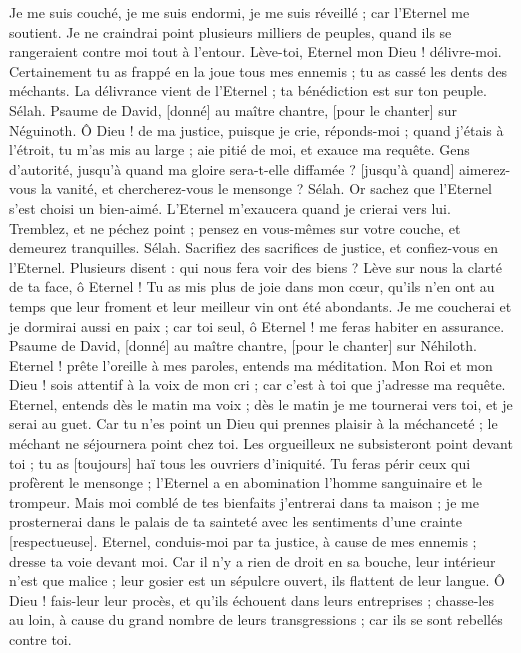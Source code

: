 \begin{multicols}{2}
Je me suis couché, je me suis endormi, je me suis réveillé ; car l'Eternel me soutient.
Je ne craindrai point plusieurs milliers de peuples, quand ils se rangeraient contre moi tout à l'entour.
Lève-toi, Eternel mon Dieu ! délivre-moi. Certainement tu as frappé en la joue tous mes ennemis ; tu as cassé les dents des méchants.
La délivrance vient de l'Eternel ; ta bénédiction est sur ton peuple. Sélah.
\VerseOne{}Psaume de David, [donné] au maître chantre, [pour le chanter] sur Néguinoth. Ô Dieu ! de ma justice, puisque je crie, réponds-moi ; quand j'étais à l'étroit, tu m'as mis au large ; aie pitié de moi, et exauce ma requête.
Gens d'autorité, jusqu'à quand ma gloire sera-t-elle diffamée ? [jusqu'à quand] aimerez-vous la vanité, et chercherez-vous le mensonge ? Sélah.
Or sachez que l'Eternel s'est choisi un bien-aimé. L'Eternel m'exaucera quand je crierai vers lui.
Tremblez, et ne péchez point ; pensez en vous-mêmes sur votre couche, et demeurez tranquilles. Sélah.
Sacrifiez des sacrifices de justice, et confiez-vous en l'Eternel.
Plusieurs disent : qui nous fera voir des biens ? Lève sur nous la clarté de ta face, ô Eternel !
Tu as mis plus de joie dans mon cœur, qu'ils n'en ont au temps que leur froment et leur meilleur vin ont été abondants.
Je me coucherai et je dormirai aussi en paix ; car toi seul, ô Eternel ! me feras habiter en assurance.
\VerseOne{}Psaume de David, [donné] au maître chantre, [pour le chanter] sur Néhiloth. Eternel ! prête l'oreille à mes paroles, entends ma méditation.
Mon Roi et mon Dieu ! sois attentif à la voix de mon cri ; car c'est à toi que j'adresse ma requête.
Eternel, entends dès le matin ma voix ; dès le matin je me tournerai vers toi, et je serai au guet.
Car tu n'es point un Dieu qui prennes plaisir à la méchanceté ; le méchant ne séjournera point chez toi.
Les orgueilleux ne subsisteront point devant toi ; tu as [toujours] haï tous les ouvriers d'iniquité.
Tu feras périr ceux qui profèrent le mensonge ; l'Eternel a en abomination l'homme sanguinaire et le trompeur.
Mais moi comblé de tes bienfaits j'entrerai dans ta maison ; je me prosternerai dans le palais de ta sainteté avec les sentiments d'une crainte [respectueuse].
Eternel, conduis-moi par ta justice, à cause de mes ennemis ; dresse ta voie devant moi.
Car il n'y a rien de droit en sa bouche, leur intérieur n'est que malice ; leur gosier est un sépulcre ouvert, ils flattent de leur langue.
Ô Dieu ! fais-leur leur procès, et qu'ils échouent dans leurs entreprises ; chasse-les au loin, à cause du grand nombre de leurs transgressions ; car ils se sont rebellés contre toi.

\end{multicols}
